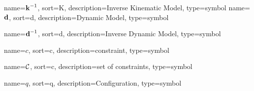 	{%
		name={\ensuremath{{\vecfunc{k}^{-1}}}},
		sort=K,
		description=Inverse Kinematic Model,
		type=symbol
	}
	\newcommand{\invkinematicmodel}{\gls{sym:invkinematicmodel}}
	{%
		name={\ensuremath{\vecfunc{d}}},
		sort=d,
		description=Dynamic Model,
		type=symbol
	}
	\newcommand{\dynamicmodel}{\gls{sym:dynamicmodel}}

	{%
		name={\ensuremath{{\vecfunc{d}^{-1}}}},
		sort=d,
		description=Inverse Dynamic Model,
		type=symbol
	}
	\newcommand{\invdynamicmodel}{\gls{sym:invdynamicmodel}}

	{%
		name=\ensuremath{c},
		sort=c,
		description=constraint,
		type=symbol
	}
	\newcommand{\constraint}{\gls{sym:constraint}}

	{%
		name=\ensuremath{\set{C}},
		sort=c,
		description=set of constraints,
		type=symbol
	}
	\newcommand{\setofconstraints}{\gls{sym:setofconstraints}}

	{%
		name=\ensuremath{q},
		sort=q,
		description=Configuration,
		type=symbol
	}
	\newcommand{\configuration}{\gls{sym:configuration}}

